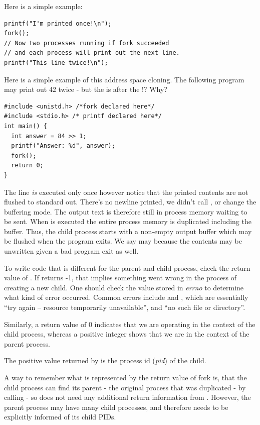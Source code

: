 Here is a simple example:

\begin{verbatim}
printf("I'm printed once!\n");
fork();
// Now two processes running if fork succeeded
// and each process will print out the next line.
printf("This line twice!\n");
\end{verbatim}

Here is a simple example of this address space cloning.
The following program may print out 42 twice - but the  is after the !? Why?

\begin{verbatim}
#include <unistd.h> /*fork declared here*/
#include <stdio.h> /* printf declared here*/
int main() {
  int answer = 84 >> 1;
  printf("Answer: %d", answer);
  fork();
  return 0;
}
\end{verbatim}

The  line \emph{is} executed only once however notice that the printed contents are not flushed to standard out.
There's no newline printed, we didn't call , or change the buffering mode.
The output text is therefore still in process memory waiting to be sent.
When  is executed the entire process memory is duplicated including the buffer.
Thus, the child process starts with a non-empty output buffer which may be flushed when the program exits.
We say may because the contents may be unwritten given a bad program exit as well.

To write code that is different for the parent and child process, check the return value of .
If  returns -1, that implies something went wrong in the process of creating a new child.
One should check the value stored in \emph{errno} to determine what kind of error occurred.
Common errors include  and , which are essentially ``try again -- resource temporarily unavailable'', and ``no such file or directory''.

Similarly, a return value of 0 indicates that we are operating in the context of the child process, whereas a positive integer shows that we are in the context of the parent process.

The positive value returned by  is the process id (\emph{pid}) of the child.

A way to remember what is represented by the return value of fork is, that the child process can find its parent - the original process that was duplicated - by calling  - so does not need any additional return information from . However, the parent process may have many child processes, and therefore needs to be explicitly informed of its child PIDs.

